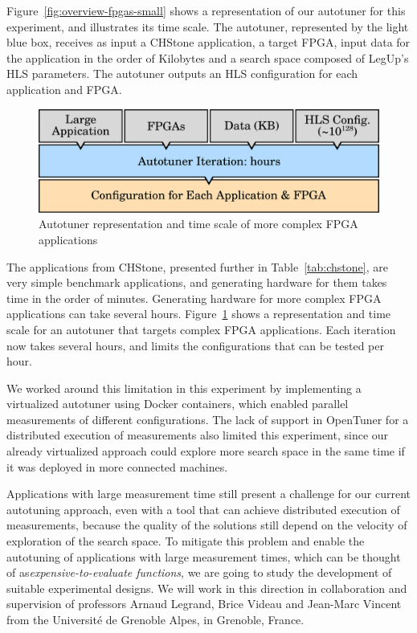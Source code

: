 Figure~\ref{fig:overview-fpgas-small} shows a representation of our autotuner
for this experiment, and illustrates its time scale.  The autotuner,
represented by the light blue box, receives as input a CHStone application, a
target FPGA, input data for the application in the order of Kilobytes and a
search space composed of LegUp's HLS parameters. The autotuner outputs an HLS
configuration for each application and FPGA.

\begin{figure}[htpb]
    \centering
    \includegraphics[width=.65\textwidth]{./images/overview_fpgas_big}
    \caption{Autotuner representation and time scale of more complex FPGA
    applications}
    \label{fig:overview-fpgas-big}
\end{figure}

The applications from CHStone, presented further in Table~\ref{tab:chstone},
are very simple benchmark applications, and generating hardware for them takes
time in the order of minutes. Generating hardware for more complex FPGA
applications can take several hours. Figure~\ref{fig:overview-fpgas-big} shows
a representation and time scale for an autotuner that targets complex FPGA
applications. Each iteration now takes several hours, and limits the
configurations that can be tested per hour.

We worked around this limitation in this experiment by implementing a
virtualized autotuner using Docker containers, which enabled parallel
measurements of different configurations. The lack of support in OpenTuner for
a distributed execution of measurements also limited this experiment, since our
already virtualized approach could explore more search space in the same time
if it was deployed in more connected machines.

Applications with large measurement time still present a challenge for our
current autotuning approach, even with a tool that can achieve distributed
execution of measurements, because the quality of the solutions still depend on
the velocity of exploration of the search space.  To mitigate this problem and
enable the autotuning of applications with large measurement times, which can
be thought of as\textit{expensive-to-evaluate functions}, we are going to study
the development of suitable experimental designs. We will work in this
direction in collaboration and supervision of professors Arnaud Legrand, Brice
Videau and Jean-Marc Vincent from the Université de Grenoble Alpes, in
Grenoble, France.

